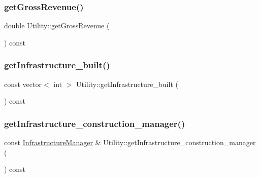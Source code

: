 \mbox{\label{classUtility_a2903344b317f0949014c687d285b64b6_a2903344b317f0949014c687d285b64b6}} 
\subsubsection{\texorpdfstring{get\+Gross\+Revenue()}{getGrossRevenue()}}
{\footnotesize\ttfamily double Utility\+::get\+Gross\+Revenue (\begin{DoxyParamCaption}{ }\end{DoxyParamCaption}) const}

\mbox{\label{classUtility_aa4ba8f1d43faa9c2aea8a0d17ad2a996_aa4ba8f1d43faa9c2aea8a0d17ad2a996}} 
\subsubsection{\texorpdfstring{get\+Infrastructure\+\_\+built()}{getInfrastructure\_built()}}
{\footnotesize\ttfamily const vector$<$ int $>$ Utility\+::get\+Infrastructure\+\_\+built (\begin{DoxyParamCaption}{ }\end{DoxyParamCaption}) const}

\mbox{\label{classUtility_a1586d2f567eb9a08e2630de612ba73a6_a1586d2f567eb9a08e2630de612ba73a6}} 
\subsubsection{\texorpdfstring{get\+Infrastructure\+\_\+construction\+\_\+manager()}{getInfrastructure\_construction\_manager()}}
{\footnotesize\ttfamily const \mbox{\hyperlink{classInfrastructureManager}{Infrastructure\+Manager}} \& Utility\+::get\+Infrastructure\+\_\+construction\+\_\+manager (\begin{DoxyParamCaption}{ }\end{DoxyParamCaption}) const}

